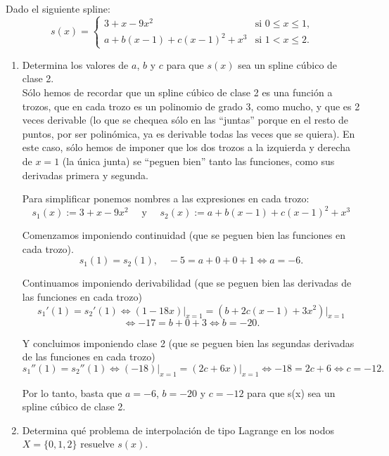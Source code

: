 \documentclass[12pt]{article}
\begin{document}
	\begin{ejercicio}
		Dado el siguiente spline:
		$$ s(x)=
		\begin{cases}
			3+x-9x^2 & \text{si } 0 \leq x \leq 1, \\
			a + b(x - 1) + c(x - 1)^2 + x^3 & \text{si } 1 < x \leq 2.
		\end{cases}$$
		
		\begin{enumerate}[label=\alph*)]
			\item Determina los valores de $a$, $b$ y $c$ para que $s(x)$ sea un spline cúbico de clase 2. \\
			
				Sólo hemos de recordar que un spline cúbico de clase 2 es una función a trozos, que en cada trozo es un
				polinomio de grado 3, como mucho, y que es 2 veces derivable (lo que se chequea sólo en las “juntas” porque
				en el resto de puntos, por ser polinómica, ya es derivable todas las veces que se quiera). En este caso, sólo
				hemos de imponer que los dos trozos a la izquierda y derecha de $x = 1$ (la única junta) se “peguen bien”
				tanto las funciones, como sus derivadas primera y segunda.
				
				Para simplificar ponemos nombres a las expresiones en cada trozo:
				$$ s_1(x):=3+x-9x^2 \quad \text{ y } \quad s_2(x):= a + b(x - 1) + c(x - 1)^2 + x^3 $$
				
				Comenzamos imponiendo continuidad (que se peguen bien las funciones en cada trozo).
				$$ s_1(1) = s_2(1), \quad -5 = a + 0 + 0 + 1\iff \boxed{a = -6}.$$
				
				Continuamos imponiendo derivabilidad (que se peguen bien las derivadas de las funciones en cada trozo)
				$$s_1'(1) = s_2'(1) \iff  (1 - 18x) \big|_{x=1} = \left( b + 2c(x - 1) + 3x^2 \right) \big|_{x=1}$$
				$$ \iff -17 = b + 0 + 3 \iff \boxed{b = -20}.$$
				
				Y concluimos imponiendo clase 2 (que se peguen bien las segundas derivadas de las funciones en cada trozo)
				$$s_1''(1) = s_2''(1) \iff (-18) \big|_{x=1} = \left( 2c + 6x \right) \big|_{x=1} \iff -18 = 2c + 6\iff\boxed{ c = -12}.$$
				
				 Por lo tanto, basta que $a = -6$, $b = -20$ y $c = -12$ para que s(x) sea un spline cúbico de clase 2.
			
			\item Determina qué problema de interpolación de tipo Lagrange en los nodos $X = \{0, 1, 2\}$ resuelve $s(x)$. \\
			

\end{enumerate}
\end{ejercicio}
\end{document}
